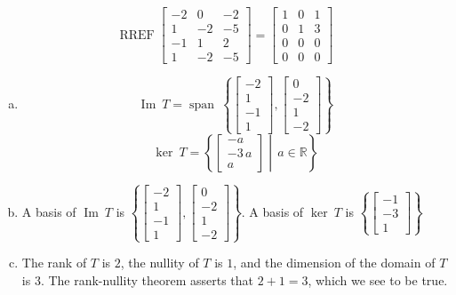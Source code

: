 \begin{exerciseAnswer} 


\[\operatorname{RREF} \left[\begin{array}{ccc}
-2 & 0 & -2 \\
1 & -2 & -5 \\
-1 & 1 & 2 \\
1 & -2 & -5
\end{array}\right] = \left[\begin{array}{ccc}
1 & 0 & 1 \\
0 & 1 & 3 \\
0 & 0 & 0 \\
0 & 0 & 0
\end{array}\right] \]


\begin{enumerate}[(a)]
\item \[\operatorname{Im}\ T = \operatorname{span}\  \left\{ \left[\begin{array}{c}
-2 \\
1 \\
-1 \\
1
\end{array}\right] , \left[\begin{array}{c}
0 \\
-2 \\
1 \\
-2
\end{array}\right] \right\} \]\[\operatorname{ker}\ T =  \left\{ \left[\begin{array}{c}
-a \\
-3 \, a \\
a
\end{array}\right] \middle|\,a\in\mathbb{R}\right\} \]
\item  A basis of \(\operatorname{Im}\ T\) is \( \left\{ \left[\begin{array}{c}
-2 \\
1 \\
-1 \\
1
\end{array}\right] , \left[\begin{array}{c}
0 \\
-2 \\
1 \\
-2
\end{array}\right] \right\} \). A basis of \(\operatorname{ker}\ T\) is \( \left\{ \left[\begin{array}{c}
-1 \\
-3 \\
1
\end{array}\right] \right\} \)
\item  The rank of \(T\) is \( 2 \), the nullity of \(T\) is \( 1 \), and the dimension of the domain of \(T\) is \( 3 \). The rank-nullity theorem asserts that \( 2 + 1 = 3 \), which we see to be true. 
\end{enumerate}
    
\end{exerciseAnswer}
    
